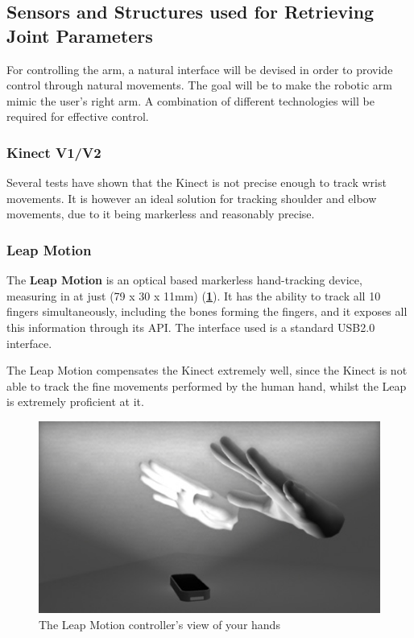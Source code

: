 \documentclass[12p,a4paper]{report}
\begin{document}
\subsection{Sensors and Structures used for Retrieving Joint Parameters}

For controlling the arm, a natural interface will be devised in order to provide control through natural movements. The goal will be to make the robotic arm mimic the user's right arm. 
A combination of different technologies will be required for effective control. 
\subsubsection{Kinect V1/V2}

Several tests have shown that the Kinect is not precise enough to track wrist movements. It is however an ideal solution for tracking shoulder and elbow movements, due to it being markerless and reasonably precise.

\subsubsection{Leap Motion}

The \textbf{Leap Motion} is an optical based markerless hand-tracking device, measuring in at just (79 x 30 x 11mm) (\textbf{\ref{fig:leapview}}). It has the ability to track all 10 fingers simultaneously, including the bones forming the fingers, and it exposes all this information through its API. The interface used is a standard USB2.0 interface.

The Leap Motion compensates the Kinect extremely well, since the Kinect is not able to track the fine movements performed by the human hand, whilst the Leap is extremely proficient at it.

\begin{figure}[H]
\begin{center}

\includegraphics[scale=0.70]{Leap_View}
\caption{The Leap Motion controller’s view of your hands}
\label{fig:leapview}
\end{center}
\end{figure}
\end{document}
